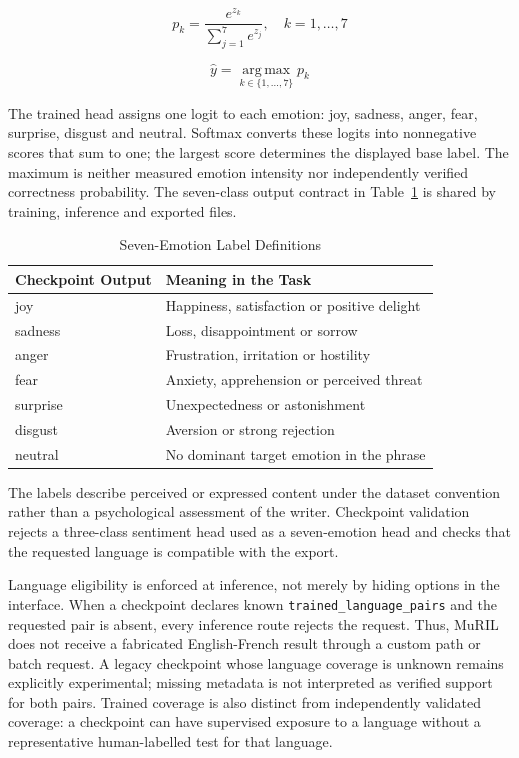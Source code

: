 \documentclass[journal]{IEEEtran}
\begin{document}
\begin{equation}
p_k=\frac{e^{z_k}}{\sum_{j=1}^{7}e^{z_j}},\quad k=1,\ldots,7
\label{eq:softmax}
\end{equation}

\begin{equation}
\hat y=\operatorname*{arg\,max}_{k\in\{1,\ldots,7\}}p_k
\label{eq:argmax}
\end{equation}

The trained head assigns one logit to each emotion: joy, sadness, anger, fear, surprise, disgust and neutral. Softmax converts these logits into nonnegative scores that sum to one; the largest score determines the displayed base label. The maximum is neither measured emotion intensity nor independently verified correctness probability. The seven-class output contract in Table~\ref{tab:emotion_labels} is shared by training, inference and exported files.

\begin{table}[!t]
\caption{Seven-Emotion Label Definitions}\label{tab:emotion_labels}
\centering
\footnotesize
\begin{tabularx}{\columnwidth}{@{}>{\raggedright\arraybackslash}X>{\raggedright\arraybackslash}X@{}}
\toprule
\textbf{Checkpoint Output} & \textbf{Meaning in the Task} \\
\midrule
joy & Happiness, satisfaction or positive delight \\
sadness & Loss, disappointment or sorrow \\
anger & Frustration, irritation or hostility \\
fear & Anxiety, apprehension or perceived threat \\
surprise & Unexpectedness or astonishment \\
disgust & Aversion or strong rejection \\
neutral & No dominant target emotion in the phrase \\
\bottomrule
\end{tabularx}
\end{table}


The labels describe perceived or expressed content under the dataset convention rather than a psychological assessment of the writer. Checkpoint validation rejects a three-class sentiment head used as a seven-emotion head and checks that the requested language is compatible with the export.

Language eligibility is enforced at inference, not merely by hiding options in the interface. When a checkpoint declares known \texttt{trained\_\allowbreak{}language\_\allowbreak{}pairs} and the requested pair is absent, every inference route rejects the request. Thus, MuRIL does not receive a fabricated English-French result through a custom path or batch request. A legacy checkpoint whose language coverage is unknown remains explicitly experimental; missing metadata is not interpreted as verified support for both pairs. Trained coverage is also distinct from independently validated coverage: a checkpoint can have supervised exposure to a language without a representative human-labelled test for that language.
\end{document}
